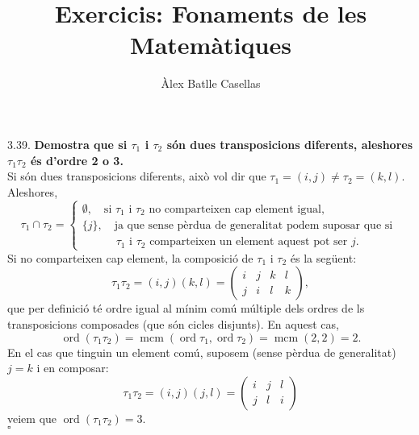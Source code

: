 \documentclass[11pt]{article}
\title{Exercicis: Fonaments de les Matemàtiques}
\author{Àlex Batlle Casellas}
\DeclareMathOperator{\ord}{ord}
\DeclareMathOperator{\mcm}{mcm}
\begin{document}
\begin{legal}
	\item[3.39.] \textbf{Demostra que si $\tau_1$ i $\tau_2$ són dues transposicions diferents, aleshores $\tau_1\tau_2$ és d'ordre 2 o 3.}\\
	Si són dues transposicions diferents, això vol dir que $\tau_1=(i,j)\neq\tau_2=(k,l)$. Aleshores,
	$$
	\tau_1\cap\tau_2=\begin{cases}
	\emptyset,\quad\textrm{si }\tau_1\textrm{ i }\tau_2\textrm{ no comparteixen cap element igual,}\\
	\{j\},\quad\textrm{ja que sense pèrdua de generalitat podem suposar que si }\\
	\qquad\quad\tau_1\textrm{ i }\tau_2\textrm{ comparteixen un element aquest pot ser }j.
	\end{cases}
	$$
	Si no comparteixen cap element, la composició de $\tau_1$ i $\tau_2$ és la següent:
	$$
	\tau_1\tau_2=(i,j)(k,l)=\begin{pmatrix}
	i & j & k & l\\
	j & i & l & k
	\end{pmatrix},
	$$
	que per definició té ordre igual al mínim comú múltiple dels ordres de ls transposicions composades (que són cicles disjunts). En aquest cas,
	$$
	\ord(\tau_1\tau_2)=\mcm(\ord{\tau_1},\ord{\tau_2})=\mcm(2,2)=2.
	$$
	En el cas que tinguin un element comú, suposem (sense pèrdua de generalitat) $j=k$ i en composar:
	$$
	\tau_1\tau_2=(i,j)(j,l)=\begin{pmatrix}
	i & j & l\\
	j & l & i
	\end{pmatrix}
	$$
	veiem que $\ord(\tau_1\tau_2)=3$.\\
	$\square$
\end{legal}
\end{document}
